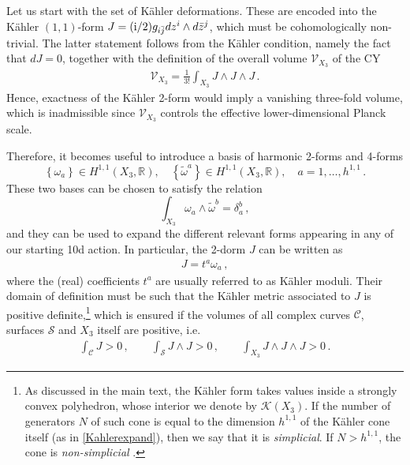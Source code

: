 Let us start with the set of K\"ahler deformations. These are encoded into the K\"ahler $(1,1)$-form $J = (\text{i}/2) g_{i \bar j} dz^i \wedge d\bar{z}^j$, which must be cohomologically non-trivial. The latter statement follows from the K\"ahler condition, namely the fact that $dJ=0$, together with the definition of the overall volume $\mathcal{V}_{X_3}$ of the CY
%
\begin{align} \label{eq:CYvolume}
   \mathcal{V}_{X_3} = \frac{1}{3!}\int_{X_3} J\wedge J \wedge J \, .
\end{align}
%
Hence, exactness of the K\"ahler 2-form would imply a vanishing three-fold volume, which is inadmissible since $\mathcal{V}_{X_3}$ controls the effective lower-dimensional Planck scale.

Therefore, it becomes useful to introduce a basis of harmonic 2-forms and 4-forms
%
\begin{equation}
\label{eq:h11forms}
\left\{\omega_{a}\right\} \in H^{1,1}(X_3, \mathbb{R}), \quad\left\{\tilde{\omega}^{a}\right\} \in H^{1,1}(X_3, \mathbb{R}), \quad a=1, \ldots, h^{1,1}\, .
\end{equation}
%
These two bases can be chosen to satisfy the relation
%
\begin{equation}
\label{eq:2formsproductN=2}
\int_{X_3} \omega_{a} \wedge \tilde{\omega}^{b}=\delta_{a}^{b}\, ,
\end{equation}
%
and they can be used to expand the different relevant forms appearing in any of our starting 10d action. In particular, the 2-dorm $J$ can be written as
%
\begin{align}\label{Kahlerexpand}
J= t^a \omega_a \, ,
\end{align}
where the (real) coefficients $t^a$ are usually referred to as K\"ahler moduli. Their domain of definition must be such that the K\"ahler metric associated to $J$ is positive definite,\footnote{As discussed in the main text, the K\"ahler form takes values inside a strongly convex polyhedron, whose interior we denote by $\mathcal{K}(X_3)$. If the number of generators $N$ of such cone is equal to the dimension $h^{1,1}$ of the K\"ahler cone itself (as in \eqref{Kahlerexpand}), then we say that it is \emph{simplicial}. If $N > h^{1,1}$, the cone is \emph{non-simplicial} \cite{Rudelius:2014wla,Heidenreich:2020ptx}.} which is ensured if the volumes of all complex curves $\mathcal{C}$, surfaces $\mathcal{S}$ and $X_3$ itself are positive, i.e.
%
\begin{align}
\int_{\mathcal{C}} J>0 \, ,\qquad \int_{\mathcal{S}} J\wedge J>0\, ,\qquad \int_{X_3} J\wedge J\wedge J>0\, . 
\end{align}
